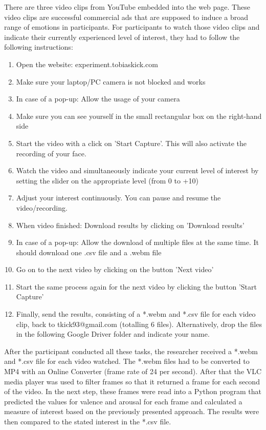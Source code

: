 There are three video clips from YouTube embedded into the web page. These video clips are successful commercial ads that are supposed to induce a broad range of emotions in participants.
\newline\newline
For participants to watch those video clips and indicate their currently experienced level of interest, they had to follow the following instructions:

\begin{enumerate}[noitemsep]
    \item Open the website: experiment.tobiaskick.com
    \item Make sure your laptop/PC camera is not blocked and works
    \item In case of a pop-up: Allow the usage of your camera
    \item Make sure you can see yourself in the small rectangular box on the right-hand side
    \item Start the video with a click on 'Start Capture'. This will also activate the recording of your face.
    \item Watch the video and simultaneously indicate your current level of interest by setting the slider on the appropriate level (from 0 to +10)
    \item Adjust your interest continuously. You can pause and resume the video/recording.
    \item When video finished: Download results by clicking on 'Download results'
    \item In case of a pop-up: Allow the download of multiple files at the same time. It should download one .csv file and a .webm file
    \item Go on to the next video by clicking on the button 'Next video'
    \item Start the same process again for the next video by clicking the button 'Start Capture'
    \item Finally, send the results, consisting of a *.webm and *.csv file for each video clip, back to tkick93@gmail.com (totalling 6 files). Alternatively, drop the files in the following Google Driver folder and indicate your name.
\end{enumerate}

After the participant conducted all these tasks, the researcher received a *.webm and *.csv file for each video watched. The *.webm files had to be converted to MP4 with an Online Converter (frame rate of 24 per second). After that the VLC media player was used to filter frames so that it returned a frame for each second of the video.
\newline\newline
In the next step, these frames were read into a Python program that predicted the values for valence and arousal for each frame and calculated a measure of interest based on the previously presented approach. The results were then compared to the stated interest in the *.csv file.


